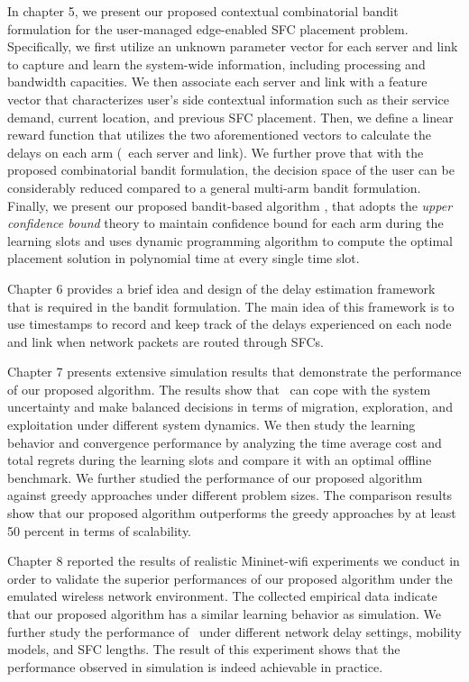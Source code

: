 In chapter 5, we present our proposed contextual combinatorial bandit formulation for the user-managed edge-enabled SFC placement problem. Specifically, we first utilize an unknown parameter vector for each server and link to capture and learn the system-wide information, including processing and bandwidth capacities. We then associate each server and link with a feature vector that characterizes user's side contextual information such as their service demand, current location, and previous SFC placement.  Then, we define a linear reward function that utilizes the two aforementioned vectors to calculate the delays on each arm (\ie\ each server and link). We further prove that with the proposed combinatorial bandit formulation, the decision space of the user can be considerably reduced compared to a general multi-arm bandit formulation.
Finally, we present our proposed bandit-based algorithm \myalgorithm, that adopts the \textit{upper confidence bound} theory to maintain confidence bound for each arm during the learning slots and uses dynamic programming algorithm to compute the optimal placement solution in polynomial time at every single time slot.

Chapter 6 provides a brief idea and design of the delay estimation framework that is required in the bandit formulation. The main idea of this framework is to use timestamps to record and keep track of the delays experienced on each node and link when network packets are routed through SFCs.

Chapter 7 presents extensive simulation results that demonstrate the performance of our proposed algorithm. The results show that \myalgorithm\ can cope with the system uncertainty and make balanced decisions in terms of migration, exploration, and exploitation under different system dynamics. 
We then study the learning behavior and convergence performance by analyzing the time average cost and total regrets during the learning slots and compare it with an optimal offline benchmark.
We further studied the performance of our proposed algorithm against greedy approaches under different problem sizes. The comparison results show that our proposed algorithm outperforms the greedy approaches by at least 50 percent in terms of scalability.

Chapter 8 reported the results of realistic Mininet-wifi experiments we conduct in order to validate the superior performances of our proposed algorithm under the emulated wireless network environment.
The collected empirical data indicate that our proposed algorithm has a similar learning behavior as simulation.
We further study the performance of \myalgorithm\ under different network delay settings,  mobility models, and SFC lengths. The result of this experiment shows that the performance observed in simulation is indeed achievable in practice.




